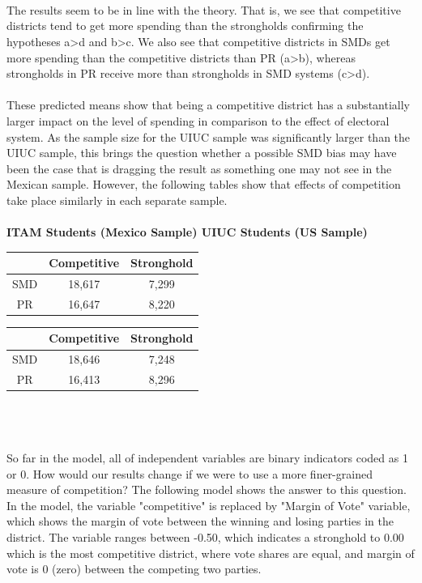 \documentclass{article}
\begin{document}
\\
\\
\\
The results seem to be in line with the theory. That is, we see that competitive districts tend to get more spending than the strongholds confirming the hypotheses a>d and b>c. We also see that competitive districts in SMDs get more spending than the competitive districts than PR (a>b), whereas strongholds in PR receive more than strongholds in SMD systems (c>d). \\
\\
These predicted means show that being a competitive district has a substantially larger impact on the level of spending in comparison to the effect of electoral system. As the sample size for the UIUC sample was significantly larger than the UIUC sample, this brings the question whether a possible SMD bias may have been the case that is dragging the result as something one may not see in the Mexican sample. However, the following tables show that effects of competition take place similarly in each separate sample.\\
\\
\textbf{ITAM Students (Mexico Sample) UIUC Students (US Sample)}\\
\begin{left}
	\begin{tabular}{ |c|c|c| } 
		\hline
		 & Competitive & Stronghold \\ 
		\hline
		SMD & 18,617 & 7,299 \\ 
		\hline
		PR & 16,647 & 8,220 \\ 
		\hline
	\end{tabular}
\end{left}
\begin{right}
	\begin{tabular}{ |c|c|c| } 
		\hline
		 & Competitive & Stronghold \\ 
		\hline
		SMD & 18,646 & 7,248 \\ 
		\hline
		PR & 16,413 & 8,296 \\ 
		\hline
	\end{tabular}
\end{right}\\
\\
\\
So far in the model, all of independent variables are binary indicators coded as 1 or 0. How would our results change if we were to use a more finer-grained measure of competition? The following model shows the answer to this question. In the model, the variable "competitive" is replaced by "Margin of Vote" variable, which shows the margin of vote between the winning and losing parties in the district. The variable ranges between -0.50, which indicates a stronghold to 0.00 which is the most competitive district, where vote shares are equal, and margin of vote is 0 (zero) between the competing two parties. \\
\end{document}
